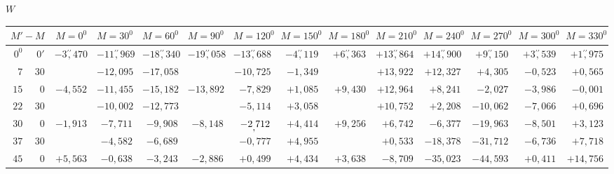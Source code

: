 \begin{landscape}
\begingroup
\fontsize{8.5}{10.5}\selectfont
{}
\renewcommand{\headrulewidth}{0pt}
\begin{center}\(W\)\end{center}
\setlength{\tabcolsep}{2.5pt}
\renewcommand{\arraystretch}{1.08}
\begin{longtable}{@{}rr|r|r|r|r|r|r|r|r|r|r|r|r@{}}
\hline
\multicolumn{2}{c|}{\(M'-M\)} & \(M=0^0\) & \(M=30^0\) & \(M=60^0\) & \(M=90^0\) & \(M=120^0\) & \(M=150^0\) & \(M=180^0\) & \(M=210^0\) & \(M=240^0\) & \(M=270^0\) & \(M=300^0\) & \(M=330^0\)\\
\hline
\endhead
\(0^0\) & \(0'\) & \(-3\overset{\prime\prime}{,}470\) & \(-11\overset{\prime\prime}{,}969\) & \(-18\overset{\prime\prime}{,}340\) & \(-19\overset{\prime\prime}{,}058\) & \(-13\overset{\prime\prime}{,}688\) & \(-4\overset{\prime\prime}{,}119\) & \(+6\overset{\prime\prime}{,}363\) & \(+13\overset{\prime\prime}{,}864\) & \(+14\overset{\prime\prime}{,}900\) & \(+9\overset{\prime\prime}{,}150\) & \(+3\overset{\prime\prime}{,}539\) & \(+1\overset{\prime\prime}{,}975\)\\
\(7\) & \(30\) &  & \(-12{,}095\) & \(-17{,}058\) &  & \(-10{,}725\) & \(-1{,}349\) &  & \(+13{,}922\) & \(+12{,}327\) & \(+4{,}305\) & \(-0{,}523\) & \(+0{,}565\)\\
\(15\) & \(0\) & \(-4{,}552\) & \(-11{,}455\) & \(-15{,}182\) & \(-13{,}892\) & \(-7{,}829\) & \(+1{,}085\) & \(+9{,}430\) & \(+12{,}964\) & \(+8{,}241\) & \(-2{,}027\) & \(-3{,}986\) & \(-0{,}001\)\\
\(22\) & \(30\) &  & \(-10{,}002\) & \(-12{,}773\) &  & \(-5{,}114\) & \(+3{,}058\) &  & \(+10{,}752\) & \(+2{,}208\) & \(-10{,}062\) & \(-7{,}066\) & \(+0{,}696\)\\[2pt]
\(30\) & \(0\) & \(-1{,}913\) & \(-7{,}711\) & \(-9{,}908\) & \(-8{,}148\) & \(-2\mathord{\raisebox{-0.8ex}[0pt][0pt]{\ensuremath{,}}}712\) & \(+4{,}414\) & \(+9{,}256\) & \(+6{,}742\) & \(-6{,}377\) & \(-19{,}963\) & \(-8{,}501\) & \(+3{,}123\)\\[4pt]
\(37\) & \(30\) &  & \(-4{,}582\) & \(-6{,}689\) &  & \(-0{,}777\) & \(+4{,}955\) &  & \(+0{,}533\) & \(-18{,}378\) & \(-31{,}712\) & \(-6{,}736\) & \(+7{,}718\)\\
\(45\) & \(0\) & \(+5{,}563\) & \(-0{,}638\) & \(-3{,}243\) & \(-2{,}886\) & \(+0{,}499\) & \(+4{,}434\) & \(+3{,}638\) & \(-8{,}709\) & \(-35{,}023\) & \(-44{,}593\) & \(+0{,}411\) & \(+14{,}756\)\\

\end{longtable}
\end{landscape}
